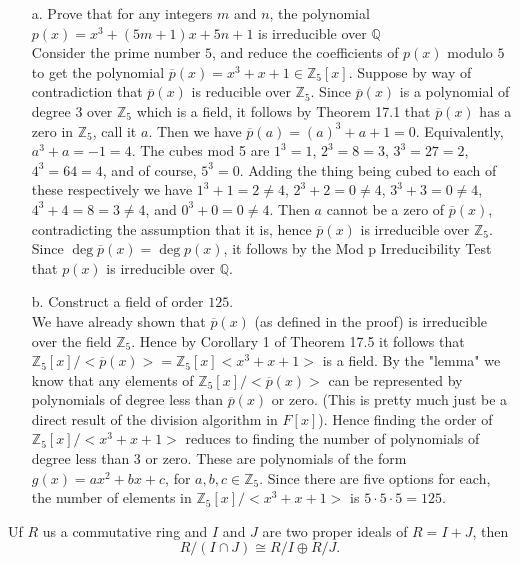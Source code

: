 \documentclass{article}
\newcommand{\Z}{\mathbb{Z}}
\newcommand{\Q}{\mathbb{Q}}
\begin{document}
\begin{itemize}
    \item[a.] Prove that for any integers $m$ and $n$, the polynomial $p(x) = x^3 + (5m + 1)x + 5n + 1$ is irreducible over $\Q$\\
    
     Consider the prime number $5$, and reduce the coefficients of $p(x)$ modulo $5$ to get the polynomial $\overline{p}(x) = x^3 + x + 1\in \Z_5[x]$. Suppose by way of contradiction that $\overline{p}(x)$ is reducible over $\Z_5$. Since $\overline{p}(x)$ is a polynomial of degree 3 over $\Z_5$ which is a field, it follows by Theorem 17.1 that $\overline{p}(x)$ has a zero in $\Z_5$, call it $a$. Then we have 
    $\overline{p}(a) = (a)^3 + a + 1 = 0$. Equivalently, $a^3 + a = -1 = 4$. The cubes mod 5 are $1^3 = 1$, $2^3 = 8 = 3$, $3^3 = 27 = 2$, $4^3 = 64 = 4$, and of course, $5^3 = 0$. Adding the thing being cubed to each of these respectively we have $1^3 + 1 = 2 \ne 4$, $2^3 + 2 = 0 \ne 4$, $3^3 + 3 = 0\ne 4$, $4^3 + 4 = 8 = 3 \ne 4$, and $0^3 + 0 = 0\ne 4$. Then $a$ cannot be a zero of $\overline{p}(x)$, contradicting the assumption that it is, hence $\overline{p}(x)$ is irreducible over $\Z_5$. Since $\deg \overline{p}(x) = \deg p(x)$, it follows by the Mod p Irreducibility Test that $p(x)$ is irreducible over $\Q$.
    \item[b.] Construct a field of order $125$. \\
     We have already shown that $\overline{p}(x)$ (as defined in the proof) is irreducible over the field $\Z_5$. Hence by Corollary 1 of Theorem 17.5 it follows that $\Z_5[x]/<\overline{p}(x)> = \Z_5[x]<x^3 + x + 1>$ is a field. By the "lemma" we know that any elements of $\Z_5[x]/<\overline{p}(x)>$ can be represented by polynomials of degree less than $\overline{p}(x)$ or zero. (This is pretty much just be a direct result of the division algorithm in $F[x]$). Hence finding the order of $\Z_5[x]/<x^3 + x + 1>$ reduces to finding the number of polynomials of degree less than $3$ or zero. These are polynomials of the form $g(x) = ax^2 + bx + c$, for $a,b,c\in \Z_5$. Since there are five options for each, the number of elements in $\Z_5[x]/<x^3 + x + 1>$ is $5\cdot 5\cdot 5 = 125$. 
\end{itemize}

\newpage

 Uf $R$ us a commutative ring and $I$ and $J$ are two proper ideals of $R = I + J$, then 
$$R/(I \cap J)\cong R/I \oplus R/J.$$
\end{document}
